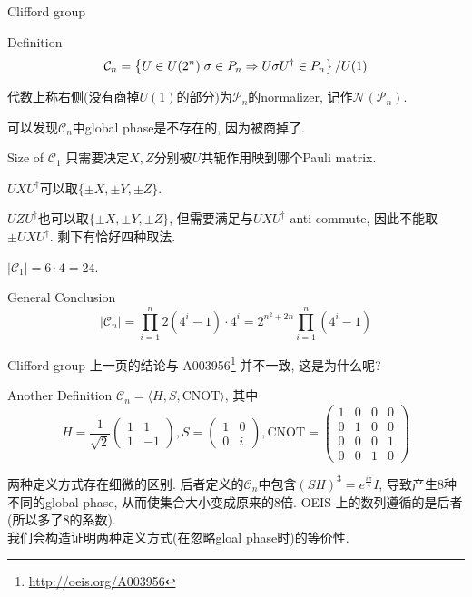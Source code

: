 \documentclass{beamer}
\begin{document}
\begin{frame}{Clifford group}
\begin{block}{Definition}
	$$\mathcal C_n = \left\{ U \in U(2^n) | \sigma \in \mathcal  \mathcal P_n \Rightarrow U\sigma U^{\dagger} \in \mathcal  \mathcal P_n\right\} / U(1)$$
	
	代数上称右侧(没有商掉$U(1)$的部分)为$\mathcal P_n$的normalizer, 记作$\mathcal N(\mathcal P_n)$.
	
	可以发现$\mathcal C_n$中global phase是不存在的, 因为被商掉了.
\end{block}	\pause
\begin{block}{Size of $\mathcal C_1$}
	\pause 只需要决定$X, Z$分别被$U$共轭作用映到哪个Pauli matrix.
	
	\pause $UXU^{\dagger}$可以取$\{\pm X, \pm Y, \pm Z\}$.
	
	\pause $UZU^{\dagger}$也可以取$\{\pm X, \pm Y, \pm Z\}$, 但需要满足与$UXU^{\dagger}$ anti-commute, 因此不能取$\pm UXU^{\dagger}$. 剩下有恰好四种取法.
	
	\pause $|\mathcal C_1| = 6 \cdot 4 = 24$.
\end{block}\pause
\begin{block}{General Conclusion}
	$$|\mathcal C_n| = \prod_{i=1}^{n}2(4^i-1)\cdot 4^i = 2^{n^2+2n}\prod_{i=1}^{n}(4^i-1)$$
\end{block}
\end{frame}

\begin{frame}{Clifford group}
	上一页的结论与 A003956\footnote{\tiny \url{http://oeis.org/A003956}} 并不一致, 这是为什么呢?\pause
\begin{block}{Another Definition}
	$\mathcal C_n = \langle H, S, \mathrm{CNOT} \rangle$, 其中
	$$H = \frac{1}{\sqrt2}\begin{pmatrix}
	1&1\\1&-1
	\end{pmatrix}, S = \begin{pmatrix}
	1&0\\0&i
	\end{pmatrix}, \mathrm{CNOT} = \begin{pmatrix}
	1&0&0&0\\
	0&1&0&0\\
	0&0&0&1\\
	0&0&1&0
	\end{pmatrix}$$
\end{block}

\pause 两种定义方式存在细微的区别. 后者定义的$\mathcal C_n$中包含$(SH)^3 = e^{\frac{i\pi}{4}}I$, 导致产生$8$种不同的global phase, 从而使集合大小变成原来的$8$倍. OEIS 上的数列遵循的是后者(所以多了$8$的系数).\\

我们会构造证明两种定义方式(在忽略gloal phase时)的等价性.
\end{frame}
\end{document}

